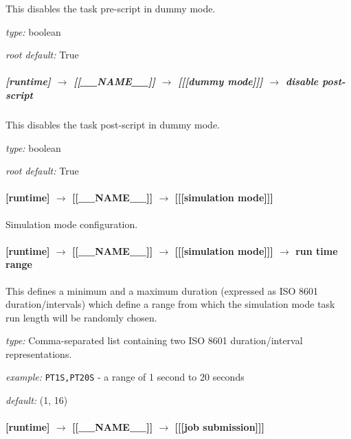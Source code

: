 This disables the task pre-script in dummy mode.

\begin{myitemize}
\item {\em type:} boolean
\item {\em root default:} True
\end{myitemize}

\subparagraph[disable post-script]{[runtime] $\rightarrow$ [[\_\_NAME\_\_]] $\rightarrow$ [[[dummy mode]]] $\rightarrow$ disable post-script}

This disables the task post-script in dummy mode.

\begin{myitemize}
\item {\em type:} boolean
\item {\em root default:} True
\end{myitemize}

\paragraph[{[[[}simulation mode{]]]}]{[runtime] $\rightarrow$ [[\_\_NAME\_\_]] $\rightarrow$ [[[simulation mode]]]}

Simulation mode configuration.

\paragraph[run time range]{[runtime] $\rightarrow$ [[\_\_NAME\_\_]] $\rightarrow$ [[[simulation mode]]] $\rightarrow$ run time range}

This defines a minimum and a maximum duration (expressed as ISO 8601
duration/intervals) which define a range from which the simulation mode task
run length will be randomly chosen.

\begin{myitemize}
    \item {\em type:} Comma-separated list containing two ISO 8601
        duration/interval representations.
    \item {\em example:} \lstinline=PT1S,PT20S= - a range of 1 second to 20
    seconds
    \item {\em default:} (1, 16)
\end{myitemize}

\paragraph[{[[[}job submission{]]]}]{[runtime] $\rightarrow$ [[\_\_NAME\_\_]] $\rightarrow$ [[[job submission]]]}

